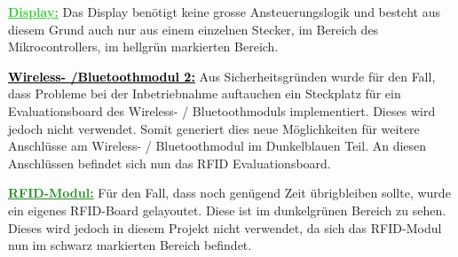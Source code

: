 \textcolor{LimeGreen}{\textbf{\underline{Display:}}}
Das Display benötigt keine grosse Ansteuerungslogik und besteht aus diesem Grund auch nur aus einem einzelnen Stecker, im Bereich des Mikrocontrollers, im hellgrün markierten Bereich.

\textcolor{black}{\textbf{\underline{Wireless- /Bluetoothmodul 2:}}}
Aus Sicherheitsgründen wurde für den Fall, dass Probleme bei der Inbetriebnahme auftauchen ein Steckplatz für ein Evaluationsboard des Wireless- / Bluetoothmoduls implementiert. Dieses wird jedoch nicht verwendet. Somit generiert dies neue Möglichkeiten für weitere Anschlüsse am Wireless- / Bluetoothmodul im Dunkelblauen Teil. An diesen Anschlüssen befindet sich nun das RFID Evaluationsboard. 

\textcolor{ForestGreen}{\textbf{\underline{RFID-Modul:}}}
Für den Fall, dass noch genügend Zeit übrigbleiben sollte, wurde ein eigenes RFID-Board gelayoutet. Diese ist im dunkelgrünen Bereich zu sehen. Dieses wird jedoch in diesem Projekt nicht verwendet, da sich das RFID-Modul nun im schwarz markierten Bereich befindet. 